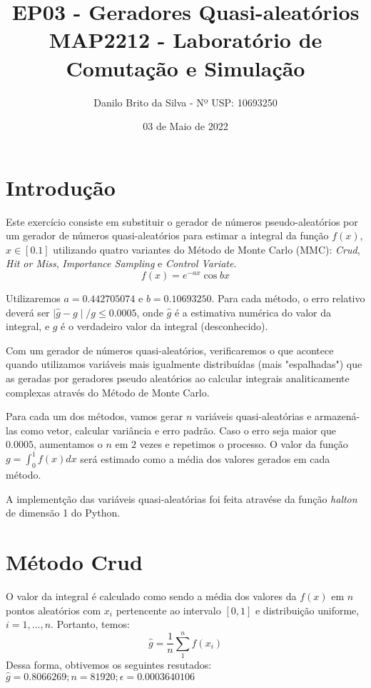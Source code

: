 \documentclass{article}
\title{EP03 - Geradores Quasi-aleatórios\\
MAP2212 - Laboratório de Comutação e Simulação}
\author{Danilo Brito da Silva - Nº USP: 10693250}
\date{03 de Maio de 2022}
\begin{document}
\maketitle

\section{Introdução}
Este exercício consiste em substituir o gerador de números pseudo-aleatórios por um gerador de números quasi-aleatórios para estimar a integral da função $f(x)$, $x \in [0.1]$ utilizando quatro variantes do Método de Monte Carlo (MMC): \textit{Crud}, \textit{Hit or Miss}, \textit{Importance Sampling} e \textit{Control Variate}.
\begin{equation}
    f(x) = e^{-a x}\cos{bx}
\end{equation}


Utilizaremos $a=0.442705074$ e $b=0.10693250$. Para cada método, o erro relativo deverá ser $\mid\hat{g} - g\mid/g \leq 0.0005$, onde $\hat{g}$ é a estimativa numérica do valor da integral, e $g$ é o verdadeiro valor da integral (desconhecido).


Com um gerador de números quasi-aleatórios, verificaremos o que acontece quando utilizamos variáveis mais igualmente distribuídas (mais "espalhadas") que as geradas por geradores pseudo aleatórios ao calcular integrais analiticamente complexas através do Método de Monte Carlo.


Para cada um dos métodos, vamos gerar $n$ variáveis quasi-aleatórias e armazená-las como vetor, calcular variância e erro padrão. Caso o erro seja maior que $0.0005$, aumentamos o $n$ em $2$ vezes e repetimos o processo. O valor da função $g = \int_{0}^{1}f(x)dx$ será estimado como a média dos valores gerados em cada método.

A implementção das variáveis quasi-aleatórias foi feita atravése da função \textit{halton} de dimensão 1 do Python.


\section{Método Crud}

O valor da integral é calculado como sendo a média dos valores da $f(x)$ em $n$ pontos aleatórios com $x_i$ pertencente ao intervalo $[0, 1]$ e distribuição uniforme, $i=1,...,n$. Portanto, temos:
$$
\hat{g}=\frac{1}{n}\sum_{1}^{n}f(x_i)
$$
Dessa forma, obtivemos os seguintes resutados:\\
 $\hat{g} = 0.8066269; n = 81920;    \epsilon = 0.0003640106$
\end{document}
